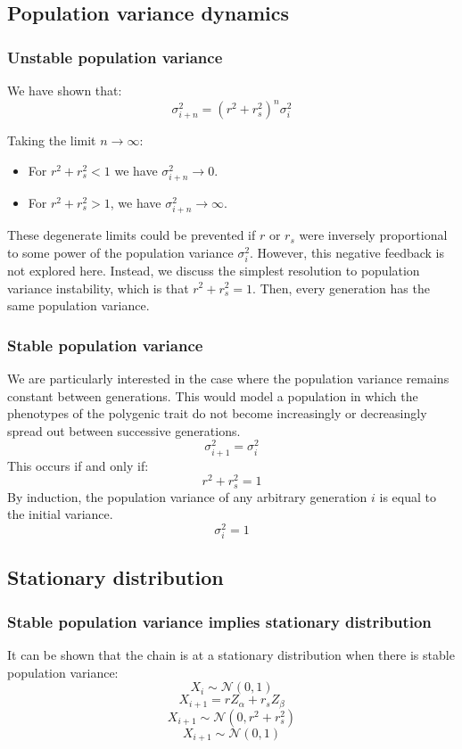 \documentclass[letterpaper,10pt]{article} %
\begin{document}
\subsection{Population variance dynamics}

\subsubsection*{Unstable population variance}
We have shown that:
$$\sigma_{i+n}^2 = (r^2+r_s^2)^n  \sigma_{i}^2$$

Taking the limit $n \rightarrow \infty$: 
\begin{itemize}
\item For $r^2+r_s^2 < 1$ we have $\sigma_{i+n}^2 \rightarrow 0$.
\item For  $r^2+r_s^2 > 1$, we have $\sigma_{i+n}^2 \rightarrow \infty$. 
\end{itemize}

These degenerate limits could be prevented if $r$ or $r_s$ were inversely proportional to some power of the population variance $\sigma_i^2$. However, this negative feedback is not explored here. Instead, we discuss the simplest resolution to population variance instability, which is that $r^2+r_s^2 = 1$. Then, every generation has the same population variance.

\subsubsection*{Stable population variance}
We are particularly interested in the case where the population variance remains constant between generations. This would model a population in which the phenotypes of the polygenic trait do not become increasingly or decreasingly spread out between successive generations. 
$$\sigma_{i+1}^2 = \sigma_i^2$$
This occurs if and only if:
$$r^2+r_s^2 = 1$$
%
By induction, the population variance of any arbitrary generation $i$ is equal to the initial variance. 
$$\sigma_i^2 = 1$$



\subsection{Stationary distribution}

\subsubsection*{Stable population variance implies stationary distribution}
It can be shown that the chain is at a stationary distribution when there is stable population variance:
$$X_i \sim \mathcal{N}(0, 1)$$
$$X_{i+1} = r Z_\alpha + r_s Z_\beta$$
$$X_{i+1} \sim \mathcal{N}(0, r^2+r_s^2)$$
$$X_{i+1} \sim \mathcal{N}(0, 1)$$
\end{document}
